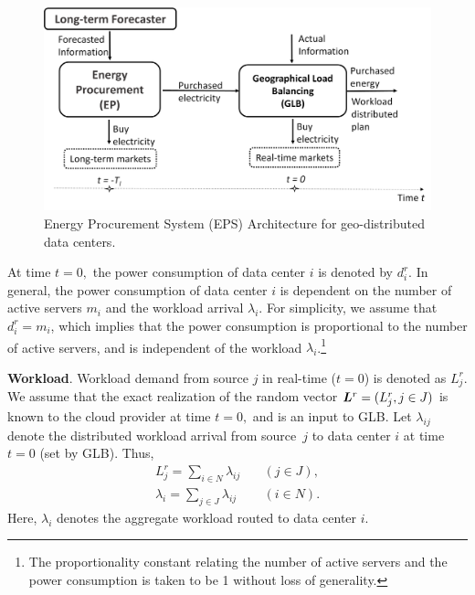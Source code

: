\begin{figure}[!t]
	\centering
	\includegraphics[width=1.0\linewidth]{figs/SystemArchitecture}
	\caption{Energy Procurement System (EPS) Architecture for geo-distributed data centers.}
	\label{fig:SystemArchitecture}
\end{figure}

At time $t = 0,$ the power consumption of data center $i$ is denoted
by $d^r_i.$ In general, the power consumption of data center $i$ is
dependent on the number of active servers $m_i$ and the workload
arrival
$\lambda_i$. %
For simplicity, we assume that $d^r_i = m_i$, which implies that the
power consumption is proportional to the number of active servers, and
is independent of the workload $\lambda_i$.\footnote{The
  proportionality constant relating the number of active servers and
  the power consumption is taken to be 1 without loss of
  generality. %
} %


\textbf{Workload}. Workload demand from source $j$ in real-time ($t = 0$) is denoted as $L^r_j.$ We assume that the exact realization of the random vector $\boldsymbol{L}^r = (L^r_j,j \in J)$ is known to the cloud provider at time $t = 0,$ and is an input to GLB. Let $\lambda_{ij}$ denote the distributed workload arrival from source~$j$ to data center $i$ at time $t = 0$ (set by GLB). Thus,
\begin{eqnarray*}
	\label{eq:constraintWorkload1}
	L^r_j = \sum_{i\in N}^{}\lambda_{ij}  & \quad (j\in J), \\
	\label{eq:constraintWorkload2}
	\lambda_i = \sum_{j\in J}^{}\lambda_{ij} & \quad (i \in N).
\end{eqnarray*}
Here, $\lambda_i$ denotes the aggregate workload routed to data center $i.$

